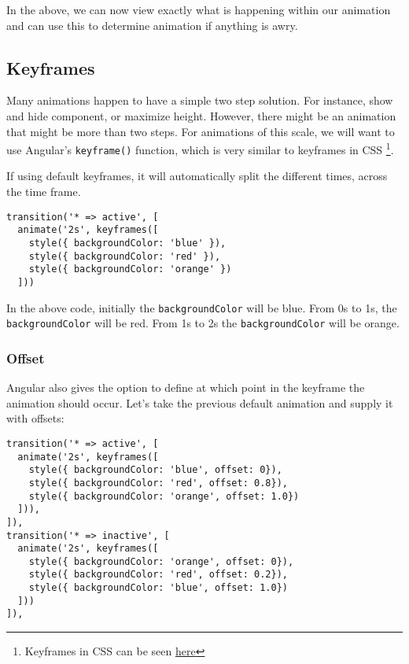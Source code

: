In the above, we can now view exactly what is happening within our animation 
and can use this to determine animation if anything is awry. 

\subsection{ Keyframes }
Many animations happen to have a simple two step solution. For instance, show 
and hide component, or maximize height. However, there might be an animation 
that might be more than two steps. For animations of this scale, we will want
to use Angular's \lstinline{keyframe()} function, which is very similar to 
keyframes in CSS \footnote{Keyframes in CSS can be seen 
\href{https://www.w3schools.com/cssref/css3_pr_animation-keyframes.asp.}{here}}.

If using default keyframes, it will automatically split the different times, 
across the time frame. 

\begin{lstlisting}
transition('* => active', [
  animate('2s', keyframes([
    style({ backgroundColor: 'blue' }),
    style({ backgroundColor: 'red' }),
    style({ backgroundColor: 'orange' })
  ]))
\end{lstlisting}

In the above code, initially the \lstinline{backgroundColor} will be blue. 
From 0s to 1s, the \lstinline{backgroundColor} will be red. From 1s to 2s the 
\lstinline{backgroundColor} will be orange. 

\subsubsection{ Offset }
Angular also gives the option to define at which point in the keyframe the 
animation should occur. Let's take the previous default animation and supply  
it with offsets: 
\begin{lstlisting}
transition('* => active', [
  animate('2s', keyframes([
    style({ backgroundColor: 'blue', offset: 0}),
    style({ backgroundColor: 'red', offset: 0.8}),
    style({ backgroundColor: 'orange', offset: 1.0})
  ])),
]),
transition('* => inactive', [
  animate('2s', keyframes([
    style({ backgroundColor: 'orange', offset: 0}),
    style({ backgroundColor: 'red', offset: 0.2}),
    style({ backgroundColor: 'blue', offset: 1.0})
  ]))
]),
\end{lstlisting}


